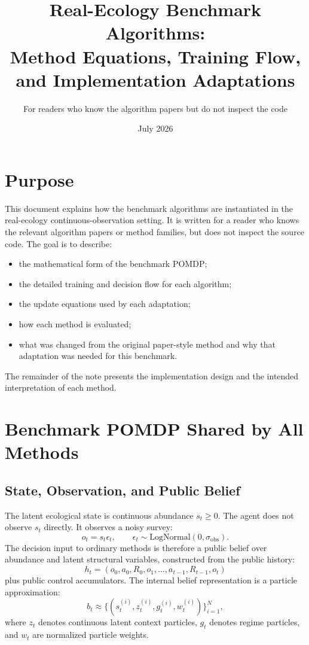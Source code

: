 \documentclass[11pt]{article}
\title{Real-Ecology Benchmark Algorithms:\\Method Equations, Training Flow, and Implementation Adaptations}
\author{For readers who know the algorithm papers but do not inspect the code}
\date{July 2026}
\newcommand{\1}{\mathbf{1}}
\begin{document}
\sloppy
\maketitle

\section{Purpose}

This document explains how the benchmark algorithms are instantiated in the
real-ecology continuous-observation setting.  It is written for a reader who
knows the relevant algorithm papers or method families, but does not inspect the
source code.  The goal is to describe:
\begin{itemize}[leftmargin=*]
  \item the mathematical form of the benchmark POMDP;
  \item the detailed training and decision flow for each algorithm;
  \item the update equations used by each adaptation;
  \item how each method is evaluated;
  \item what was changed from the original paper-style method and why that
  adaptation was needed for this benchmark.
\end{itemize}

The remainder of the note presents the implementation design and the intended
interpretation of each method.

\section{Benchmark POMDP Shared by All Methods}

\subsection{State, Observation, and Public Belief}

The latent ecological state is continuous abundance $s_t\ge 0$.  The agent does
not observe $s_t$ directly.  It observes a noisy survey:
\[
  o_t = s_t\epsilon_t,\qquad
  \epsilon_t\sim\mathrm{LogNormal}(0,\sigma_{\mathrm{obs}}).
\]
The decision input to ordinary methods is therefore a public belief over
abundance and latent structural variables, constructed from the public history:
\[
  h_t=(o_0,a_0,R_0,o_1,\ldots,a_{t-1},R_{t-1},o_t)
\]
plus public control accumulators.  The internal belief representation is a
particle approximation:
\[
  b_t \approx \{(s_t^{(i)}, z_t^{(i)}, g_t^{(i)}, w_t^{(i)})\}_{i=1}^N,
\]
where $z_t$ denotes continuous latent context particles, $g_t$ denotes regime
particles, and $w_t$ are normalized particle weights.
\end{document}
